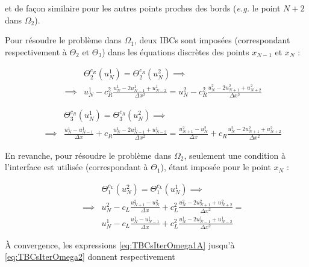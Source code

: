 \noindent et de façon similaire pour les autres points proches des bords (\emph{e.g.} le point $N+2$ dans $\Omega_2$).

\indent Pour résoudre le problème dans $\Omega_1$, deux IBCs sont imposées (correspondant respectivement à $\Theta_2$ et $\Theta_3$) dans les équations discrètes des points $x_{N-1}$ et $x_N$ : 

\begin{equation}
	\begin{aligned}
    \label{eq:TBCsIterOmega1A}
    && 				&\Theta_2^{c_R}(u_N^1) = \Theta_2^{c_R}(u_N^2) \implies \\ 
    && \implies & u_N^1 - c_R^2 \frac{u_N^1 - 2u_{N-1}^1 + u_{N-2}^1}{\Delta x^2} = u_N^2 - c_R^2 \frac{u_N^2 - 2u_{N+1}^2 + u_{N+2}^2}{\Delta x^2} 
    \end{aligned}
\end{equation}

\begin{equation}
	\begin{aligned}
    \label{eq:TBCsIterOmega1B}
    && 			   & \Theta_3^{c_R}(u_N^1) = \Theta_3^{c_R}(u_N^2) \implies \\
    && \implies & \frac{u_N^1 - u_{N-1}^1}{\Delta x} + c_R \frac{u_N^1 - 2u_{N-1}^1 + u_{N-2}^1}{\Delta x^2} = \frac{u_{N+1}^2 - u_{N}^2}{\Delta x} + c_R \frac{u_N^2 - 2u_{N+1}^2 + u_{N+2}^2}{\Delta x^2}
    \end{aligned}
\end{equation}

\indent En revanche, pour résoudre le problème dans $\Omega_2$, seulement une condition à l'interface est utilisée (correspondant à $\Theta_1$), étant imposée pour le point $x_N$ : 

\begin{equation}
	\begin{aligned}
    \label{eq:TBCsIterOmega2}
    && 				&\Theta_1^{c_L}(u_N^2) = \Theta_1^{c_L}(u_N^1) \implies \\ 
    && \implies & u_N^2 - c_L \frac{u_{N+1}^2 - u_{N}^2}{\Delta x} + c_L^2 \frac{u_N^2 - 2u_{N+1}^2 + u_{N+2}^2}{\Delta x^2}  =\\
    && 				& u_N^1 - c_L \frac{u_{N}^1 - u_{N-1}^1}{\Delta x} + c_L^2 \frac{u_N^1 - 2u_{N-1}^1 + u_{N-2}^1}{\Delta x^2}
    \end{aligned}
\end{equation}

\indent À convergence, les expressions \eqref{eq:TBCsIterOmega1A} jusqu'à \eqref{eq:TBCsIterOmega2} donnent respectivement 



